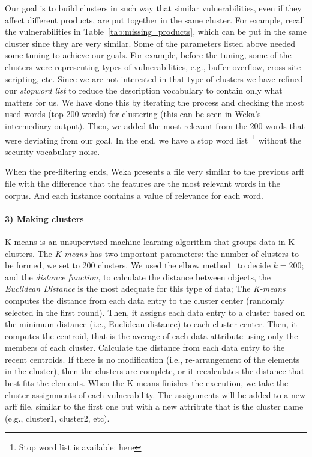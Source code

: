Our goal is to build clusters in such way that similar vulnerabilities, even if they affect different products, are put together in the same cluster. 
For example, recall the vulnerabilities in Table~\ref{tab:missing_products}, which can be put in the same cluster since they are very similar.
Some of the parameters listed above needed some tuning to achieve our goals.
For example, before the tuning, some of the clusters were representing types of vulnerabilities, e.g., buffer overflow, cross-site scripting, etc. 
Since we are not interested in that type of clusters we have refined our \emph{stopword list} to reduce the description vocabulary to contain only what matters for us.
We have done this by iterating the process and checking the most used words (top 200 words) for clustering (this can be seen in Weka's intermediary output).
Then, we added the most relevant from the 200 words that were deviating from our goal.
In the end, we have a stop word list~\footnote{Stop word list is available: here} without the security-vocabulary noise.


When the pre-filtering ends, Weka presents a file very similar to the previous \gls{arff} file with the difference that the features are the most relevant words in the corpus. And each instance contains a value of relevance for each word.


\paragraph{3) Making clusters}
K-means is an unsupervised machine learning algorithm that groups data in K clusters.
The \emph{K-means} has two important parameters: the number of clusters to be formed, we set to $200$ clusters. We used the elbow method~\cite{Thorndike:1953} to decide $k=200$; and the \emph{distance function}, to calculate the distance between objects, the \emph{Euclidean Distance} is the most adequate for this type of data;
The \emph{K-means} computes the distance from each data entry to the cluster center (randomly selected in the first round).
Then, it assigns each data entry to a cluster based on the minimum distance (i.e., Euclidean distance) to each cluster center.
Then, it computes the centroid, that is the average of each data attribute using only the members of each cluster.
Calculate the distance from each data entry to the recent centroids. 
If there is no modification (i.e., re-arrangement of the elements in the cluster), then the clusters are complete, or it recalculates the distance that best fits the elements. 
When the K-means finishes the execution, we take the cluster assignments of each vulnerability. 
The assignments will be added to a new \gls{arff} file, similar to the first one but with a new attribute that is the cluster name (e.g., cluster1, cluster2, etc). 



